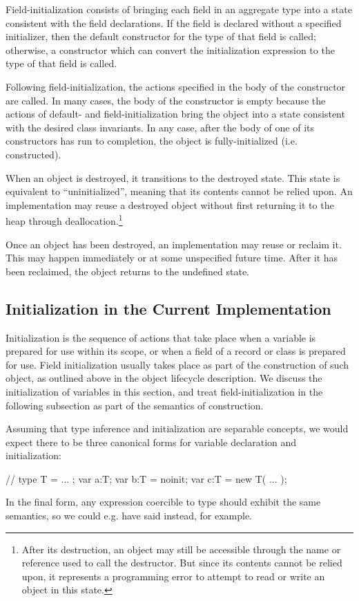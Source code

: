 Field-initialization consists of bringing each field in an aggregate type into a
state consistent with the field declarations.  If the field is declared without
a specified initializer, then the default constructor for the type of that
field is called; otherwise, a constructor which can convert the initialization
expression to the type of that field is called.

Following field-initialization, the actions specified in the body of the
constructor are called.  In many cases, the body of the constructor is empty
because the actions of default- and field-initialization bring the object into a
state consistent with the desired class invariants.  In any case, after the body
of one of its constructors has run to completion, the object is
fully-initialized (i.e. constructed).

When an object is destroyed, it transitions to the destroyed state.  This state
is equivalent to ``uninitialized'', meaning that its contents cannot be relied
upon.  An implementation may reuse a destroyed object without first returning it
to the heap through deallocation.\footnote{After its destruction, an object may
  still be accessible through the name or reference used to call the
  destructor.  But since its contents cannot be relied upon, it represents a
  programming error to attempt to read or write an object in this state.}

Once an object has been destroyed, an implementation may reuse or reclaim it.
This may happen immediately or at some unspecified future time.  After it has
been reclaimed, the object returns to the undefined state.

\subsection{Initialization in the Current Implementation}

Initialization is the sequence of actions that take place when a variable is prepared for
use within its scope, or when a field of a record or class is prepared for use.  Field
initialization usually takes place as part of the construction of such object, as outlined
above in the object lifecycle description.  We discuss the initialization of variables in
this section, and treat field-initialization in the following subsection as part of the
semantics of construction. 

Assuming that type inference and initialization are separable concepts, we would expect
there to be three canonical forms for variable declaration and initialization:
\begin{chapel}
// type T = ... ;
   var a:T;
   var b:T = noinit;
   var c:T = new T( ... );
\end{chapel}
\noindent
In the final form, any expression coercible to type  should exhibit the same
semantics, so we could e.g. have said  instead, for example.

